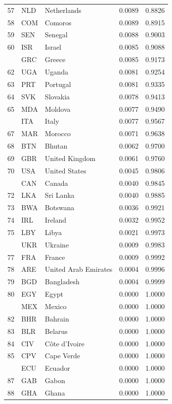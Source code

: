 \documentclass[
  12pt,
]{article}
\begin{document}
\begin{ThreePartTable}
\begin{longtable}[t]{rllrr}
57 & NLD & Netherlands & 0.0089 & 0.8826\\
58 & COM & Comoros & 0.0089 & 0.8915\\
59 & SEN & Senegal & 0.0088 & 0.9003\\
60 & ISR & Israel & 0.0085 & 0.9088\\
\addlinespace
61 & GRC & Greece & 0.0085 & 0.9173\\
62 & UGA & Uganda & 0.0081 & 0.9254\\
63 & PRT & Portugal & 0.0081 & 0.9335\\
64 & SVK & Slovakia & 0.0078 & 0.9413\\
65 & MDA & Moldova & 0.0077 & 0.9490\\
\addlinespace
66 & ITA & Italy & 0.0077 & 0.9567\\
67 & MAR & Morocco & 0.0071 & 0.9638\\
68 & BTN & Bhutan & 0.0062 & 0.9700\\
69 & GBR & United Kingdom & 0.0061 & 0.9760\\
70 & USA & United States & 0.0045 & 0.9806\\
\addlinespace
71 & CAN & Canada & 0.0040 & 0.9845\\
72 & LKA & Sri Lanka & 0.0040 & 0.9885\\
73 & BWA & Botswana & 0.0036 & 0.9921\\
74 & IRL & Ireland & 0.0032 & 0.9952\\
75 & LBY & Libya & 0.0021 & 0.9973\\
\addlinespace
76 & UKR & Ukraine & 0.0009 & 0.9983\\
77 & FRA & France & 0.0009 & 0.9992\\
78 & ARE & United Arab Emirates & 0.0004 & 0.9996\\
79 & BGD & Bangladesh & 0.0004 & 0.9999\\
80 & EGY & Egypt & 0.0000 & 1.0000\\
\addlinespace
81 & MEX & Mexico & 0.0000 & 1.0000\\
82 & BHR & Bahrain & 0.0000 & 1.0000\\
83 & BLR & Belarus & 0.0000 & 1.0000\\
84 & CIV & Côte d’Ivoire & 0.0000 & 1.0000\\
85 & CPV & Cape Verde & 0.0000 & 1.0000\\
\addlinespace
86 & ECU & Ecuador & 0.0000 & 1.0000\\
87 & GAB & Gabon & 0.0000 & 1.0000\\
88 & GHA & Ghana & 0.0000 & 1.0000\\

\end{longtable}
\end{ThreePartTable}
\end{document}
